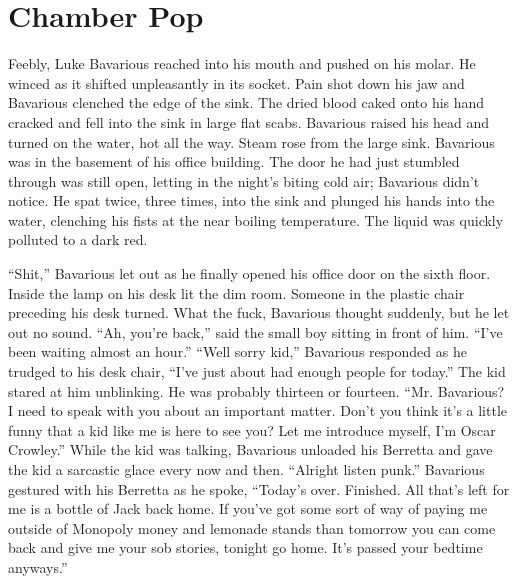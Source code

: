  



\chapter{Chamber Pop}



Feebly, Luke Bavarious reached into his mouth and pushed on his
molar. He winced as it shifted unpleasantly in its socket. Pain
shot down his jaw and Bavarious clenched the edge of the sink. The
dried blood caked onto his hand cracked and fell into the sink in
large flat scabs. Bavarious raised his head and turned on the
water, hot all the way. Steam rose from the large sink. Bavarious
was in the basement of his office building. The door he had just
stumbled through was still open, letting in the night's
biting cold air; Bavarious didn't notice. He spat twice,
three times, into the sink and plunged his hands into the water,
clenching his fists at the near boiling temperature. The liquid was
quickly polluted to a dark red.



``Shit,'' Bavarious let out as he finally opened his
office door on the sixth floor. Inside the lamp on his desk lit the
dim room. Someone in the plastic chair preceding his desk turned.
What the fuck, Bavarious thought suddenly, but he let out no sound.
``Ah, you're back,'' said the small boy sitting in
front of him. ``I've been waiting almost an hour.''
``Well sorry kid,'' Bavarious responded as he trudged to
his desk chair, ``I've just about had enough people for
today.'' The kid stared at him unblinking. He was probably
thirteen or fourteen. ``Mr. Bavarious? I need to speak with
you about an important matter. Don't you think it's a
little funny that a kid like me is here to see you? Let me
introduce myself, I'm Oscar Crowley.'' While the kid was
talking, Bavarious unloaded his Berretta and gave the kid a
sarcastic glace every now and then. ``Alright listen
punk.'' Bavarious gestured with his Berretta as he spoke,
``Today's over. Finished. All that's left for me
is a bottle of Jack back home. If you've got some sort of way
of paying me outside of Monopoly money and lemonade stands than
tomorrow you can come back and give me your sob stories, tonight go
home. It's passed your bedtime anyways.''



